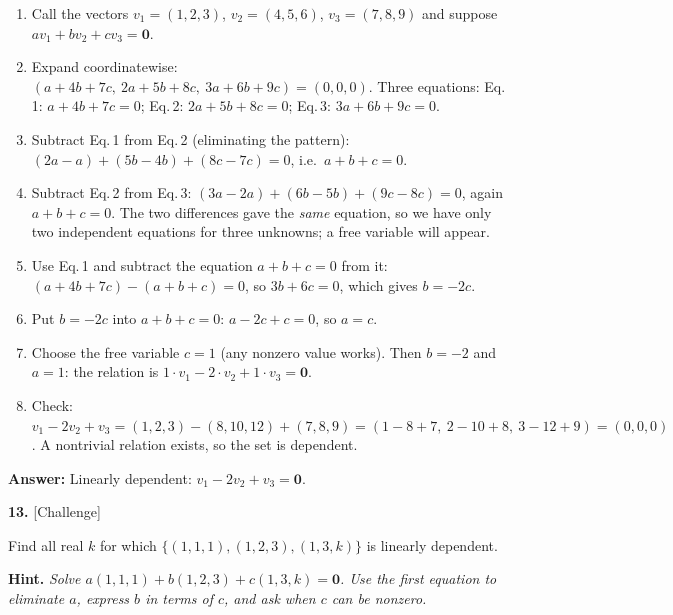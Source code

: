 \documentclass[11pt]{article}
\begin{document}
\begin{tcolorbox}[breakable,colback=ans,colframe=ansb,boxrule=0.5pt,left=4pt,right=4pt,top=2pt,bottom=2pt]\begin{enumerate}[leftmargin=2.2em,itemsep=1pt,topsep=1pt,label=\textbf{Step \arabic*.}]\item Call the vectors $v_1=(1,2,3)$, $v_2=(4,5,6)$, $v_3=(7,8,9)$ and suppose $av_1+bv_2+cv_3=\mathbf 0$.
\item Expand coordinatewise: $(a+4b+7c,\ 2a+5b+8c,\ 3a+6b+9c)=(0,0,0)$. Three equations: Eq.\,1: $a+4b+7c=0$; Eq.\,2: $2a+5b+8c=0$; Eq.\,3: $3a+6b+9c=0$.
\item Subtract Eq.\,1 from Eq.\,2 (eliminating the pattern): $(2a-a)+(5b-4b)+(8c-7c)=0$, i.e.\ $a+b+c=0$.
\item Subtract Eq.\,2 from Eq.\,3: $(3a-2a)+(6b-5b)+(9c-8c)=0$, again $a+b+c=0$. The two differences gave the \emph{same} equation, so we have only two independent equations for three unknowns; a free variable will appear.
\item Use Eq.\,1 and subtract the equation $a+b+c=0$ from it: $(a+4b+7c)-(a+b+c)=0$, so $3b+6c=0$, which gives $b=-2c$.
\item Put $b=-2c$ into $a+b+c=0$: $a-2c+c=0$, so $a=c$.
\item Choose the free variable $c=1$ (any nonzero value works). Then $b=-2$ and $a=1$: the relation is $1\cdot v_1-2\cdot v_2+1\cdot v_3=\mathbf 0$.
\item Check: $v_1-2v_2+v_3=(1,2,3)-(8,10,12)+(7,8,9)=(1-8+7,\ 2-10+8,\ 3-12+9)=(0,0,0)$ \checkmark. A nontrivial relation exists, so the set is dependent.
\end{enumerate}\textbf{Answer:} Linearly dependent: $v_1-2v_2+v_3=\mathbf 0$.\end{tcolorbox}
\par\vspace{2pt}
\begin{minipage}{\linewidth}\textbf{13.} \hfill{\scriptsize\color{ink}[Challenge]}\par\nopagebreak Find all real $k$ for which $\{(1,1,1),(1,2,3),(1,3,k)\}$ is linearly dependent.
\par\smallskip\begingroup\small\color{ink}\textbf{Hint.} \textit{Solve $a(1,1,1)+b(1,2,3)+c(1,3,k)=\mathbf 0$. Use the first equation to eliminate $a$, express $b$ in terms of $c$, and ask when $c$ can be nonzero.}\endgroup
\end{minipage}\par\nopagebreak
\end{document}
